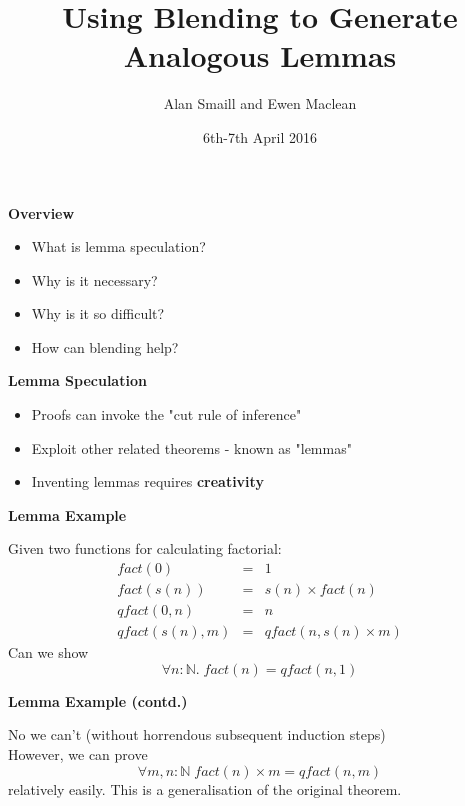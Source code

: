 \documentclass{beamer}
\title[] %
{Using Blending to Generate Analogous Lemmas}
\author[] %
{Alan Smaill and Ewen Maclean}
\institute[] %
{Edinburgh University}
\date[] %
{6th-7th April 2016}
\begin{document}
\titlepage


\begin{frame}
\begin{center}{\bf Overview}
\end{center}
\begin{itemize}
\item{What is lemma speculation?}
\item{Why is it necessary?}
\item{Why is it so difficult?}
\item{How can blending help?}
\end{itemize}
\end{frame}

\newpage

\begin{frame}
\begin{center}{\bf Lemma Speculation}\end{center}
\begin{itemize}
\item{Proofs can invoke the "cut rule of inference"}
\item{Exploit other related theorems - known as "lemmas"}
\item{Inventing lemmas requires {\bf creativity}}
\end{itemize}
\end{frame}

\newpage

\begin{frame}
\begin{center}{\bf Lemma Example}\end{center}
Given two functions for calculating factorial:
\begin{eqnarray*}
fact(0)&=&1\\
fact(s(n))&=&s(n)\times fact(n)\\
qfact(0,n)&=&n\\
qfact(s(n),m)&=&qfact(n,s(n)\times m)
\end{eqnarray*}
Can we show
$$
\forall n:\mathbb{N}.\;fact(n) = qfact(n,1)
$$
\end{frame}

\newpage

\begin{frame}
\begin{center}{\bf Lemma Example (contd.)}\end{center}
No we can't (without horrendous subsequent induction steps)\mbox{}\\
However, we can prove
$$
\forall m,n:\mathbb{N}\;fact(n) \times m = qfact(n,m)
$$
relatively easily. This is a generalisation of the original theorem.
\end{frame}
\end{document}
